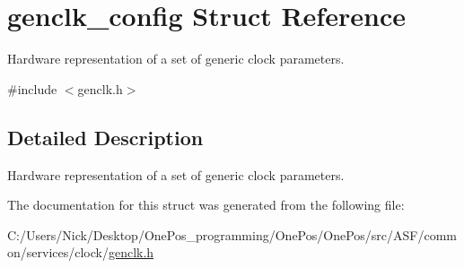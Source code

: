 \hypertarget{structgenclk__config}{\section{genclk\-\_\-config Struct Reference}
\label{structgenclk__config}
}


Hardware representation of a set of generic clock parameters.  




{\ttfamily \#include $<$genclk.\-h$>$}



\subsection{Detailed Description}
Hardware representation of a set of generic clock parameters. 

The documentation for this struct was generated from the following file\-:\begin{DoxyCompactItemize}
\item 
C\-:/\-Users/\-Nick/\-Desktop/\-One\-Pos\-\_\-programming/\-One\-Pos/\-One\-Pos/src/\-A\-S\-F/common/services/clock/\hyperlink{genclk_8h}{genclk.\-h}\end{DoxyCompactItemize}
